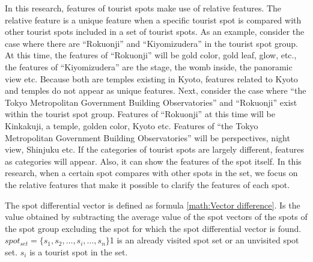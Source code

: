 \documentclass[journal]{IAENGtran}
\begin{document}
In this research, features of tourist spots make use of relative features.
The relative feature is a unique feature when a specific tourist spot is compared with other tourist spots included in a set of tourist spots.
As an example, consider the case where there are ``Rokuonji'' and ``Kiyomizudera'' in the tourist spot group.
At this time, the features of ``Rokuonji'' will be gold color, gold leaf, glow, etc., the features of ``Kiyomizudera'' are the stage, the womb inside, the panoramic view etc.
Because both are temples existing in Kyoto, features related to Kyoto and temples do not appear as unique features.
Next, consider the case where ``the Tokyo Metropolitan Government Building Observatories'' and ``Rokuonji'' exist within the tourist spot group.
Features of ``Rokuonji'' at this time will be Kinkakuji, a temple, golden color, Kyoto etc.
Features of ``the Tokyo Metropolitan Government Building Observatories'' will be perspectives, night view, Shinjuku etc.
If the categories of tourist spots are largely different, features as categories will appear.
Also, it can show the features of the spot itself.
In this research, when a certain spot compares with other spots in the set, we focus on the relative features that make it possible to clarify the features of each spot.

The spot differential vector is defined as formula \ref{math:Vector difference}.
Is the value obtained by subtracting the average value of the spot vectors of the spots of the spot group excluding the spot for which the spot differential vector is found.
$spot_{set} =\{s_1,s_2,\dots,s_i,\dots,s_n\}$1 is an already visited spot set or an unvisited spot set.
$s_i$ is a tourist spot in the set.
\end{document}
